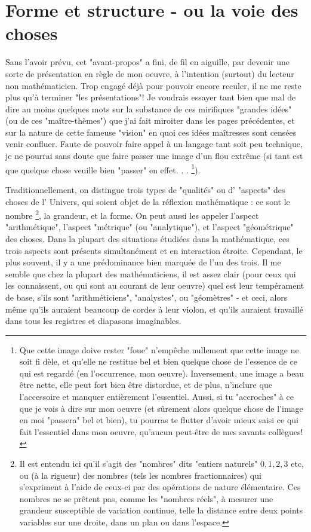 \section{Forme et structure - ou la voie des choses}

Sans l'avoir prévu, cet "avant-propos" a fini, de fil en aiguille, par devenir une sorte de présentation en règle de mon oeuvre, à l'intention (surtout) du lecteur non mathématicien. Trop engagé déjà pour pouvoir encore reculer, il ne me reste plus qu'à terminer "les présentations"! Je voudrais essayer tant bien que mal de dire au moins quelques mots sur la substance de ces mirifiques "grandes idées" (ou de ces "maître-thèmes") que j'ai fait miroiter dans les pages précédentes, et sur la nature de cette fameuse "vision" en quoi ces idées maîtresses sont censées venir confluer. Faute de pouvoir faire appel à un langage tant soit peu technique, je ne pourrai sans doute que faire passer une image d'un flou extrême (si tant est que quelque chose veuille bien "passer" en effet. . . \footnote{Que cette image doive rester "foue" n'empêche nullement que cette image ne soit fi dèle, et qu'elle ne restitue bel et bien quelque chose de l'essence de ce qui est regardé (en l'occurrence, mon oeuvre). Inversement, une image a beau être nette, elle peut fort bien être distordue, et de plus, n'inclure que l'accessoire et manquer entièrement l'essentiel. Aussi, si tu "accroches" à ce que je vois à dire sur mon oeuvre (et sûrement alors quelque chose de l'image en moi "passera" bel et bien), tu pourras te flutter d'avoir mieux saisi ce qui fait l'essentiel dans mon oeuvre, qu'aucun peut-être de mes savants collègues!}).

Traditionnellement, on distingue trois types de "qualités" ou d' "aspects" des choses de l' Univers, qui soient objet de la réflexion mathématique : ce sont le nombre \footnote{Il est entendu ici qu'il s'agit des "nombres" dits "entiers naturels" $0,1,2,3$ etc, ou (à la rigueur) des nombres (tels les nombres fractionnaires) qui s'expriment à l'aide de ceux-ci par des opérations de nature élémentaire. Ces nombres ne se prêtent pas, comme les "nombres réels", à mesurer une grandeur susceptible de variation continue, telle la distance entre deux points variables sur une droite, dans un plan ou dans l'espace.}, la grandeur, et la forme. On peut aussi les appeler l'aspect "arithmétique", l'aspect "métrique" (ou "analytique"), et l'aspect "géométrique" des choses. Dans la plupart des situations étudiées dans la mathématique, ces trois aspects sont présents simultanément et en interaction étroite. Cependant, le plus souvent, il y a une prédominance bien marquée de l'un des trois. Il me semble que chez la plupart des mathématiciens, il est assez clair (pour ceux qui les connaissent, ou qui sont au courant de leur oeuvre) quel est leur tempérament de base, s'ils sont "arithméticiens", "analystes", ou "géomètres" - et ceci, alors même qu'ils auraient beaucoup de cordes à leur violon, et qu'ils auraient travaillé dans tous les registres et diapasons imaginables.

